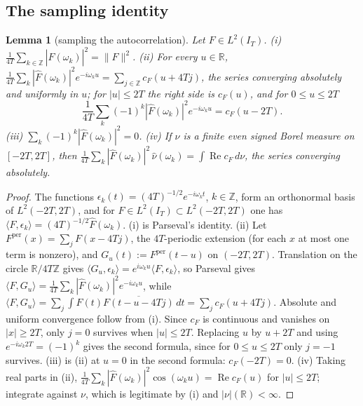 \documentclass[11pt]{amsart}
\newtheorem{lemma}[theorem]{Lemma}
\theoremstyle{definition}
\theoremstyle{remark}
\newcommand{\R}{\mathbb R}
\newcommand{\Z}{\mathbb Z}
\newcommand{\Rel}{\operatorname{Re}}
\newcommand{\IT}{I_T}
\newcommand{\nuh}{\widehat\nu}
\newcommand{\Fh}{\widehat F}
\newcommand{\cF}{c_F}
\begin{document}
\subsection{The sampling identity}

\begin{lemma}[sampling the autocorrelation]\label{lem:nyq-sampling}
Let $F\in L^2(\IT)$.
\emph{(i)} $\frac1{4T}\sum_{k\in\Z}|\Fh(\omega_k)|^2=\|F\|^2$.
\emph{(ii)} For every $u\in\R$, $\frac1{4T}\sum_k|\Fh(\omega_k)|^2e^{-i\omega_ku}=\sum_{j\in\Z}\cF(u+4Tj)$, the
series converging absolutely and uniformly in $u$; for $|u|\le2T$ the right side is $\cF(u)$, and for
$0\le u\le2T$
\[
\frac1{4T}\sum_k(-1)^k|\Fh(\omega_k)|^2e^{-i\omega_ku}=\cF(u-2T).
\]
\emph{(iii)} $\sum_k(-1)^k|\Fh(\omega_k)|^2=0$.
\emph{(iv)} If $\nu$ is a finite even signed Borel measure on $[-2T,2T]$, then
$\frac1{4T}\sum_k|\Fh(\omega_k)|^2\,\nuh(\omega_k)=\int\Rel\cF\,d\nu$, the series converging absolutely.
\end{lemma}

\begin{proof}
The functions $\epsilon_k(t)=(4T)^{-1/2}e^{-i\omega_kt}$, $k\in\Z$, form an orthonormal basis of
$L^2(-2T,2T)$, and for $F\in L^2(\IT)\subset L^2(-2T,2T)$ one has $\langle F,\epsilon_k\rangle=(4T)^{-1/2}\Fh(\omega_k)$.
(i) is Parseval's identity. (ii) Let $F^{\mathrm{per}}(x)=\sum_jF(x-4Tj)$, the $4T$-periodic extension (for each
$x$ at most one term is nonzero), and $G_u(t):=F^{\mathrm{per}}(t-u)$ on $(-2T,2T)$. Translation on the circle
$\R/4T\Z$ gives $\langle G_u,\epsilon_k\rangle=e^{i\omega_ku}\langle F,\epsilon_k\rangle$, so Parseval gives
$\langle F,G_u\rangle=\frac1{4T}\sum_k|\Fh(\omega_k)|^2e^{-i\omega_ku}$, while
$\langle F,G_u\rangle=\sum_j\int F(t)\overline{F(t-u-4Tj)}\,dt=\sum_j\cF(u+4Tj)$. Absolute and uniform convergence
follow from (i). Since $\cF$ is continuous and vanishes on $|x|\ge2T$, only $j=0$ survives when $|u|\le2T$.
Replacing $u$ by $u+2T$ and using $e^{-i\omega_k2T}=(-1)^k$ gives the second formula, since for
$0\le u\le2T$ only $j=-1$ survives. (iii) is (ii) at $u=0$ in the second formula: $\cF(-2T)=0$.
(iv) Taking real parts in (ii), $\frac1{4T}\sum_k|\Fh(\omega_k)|^2\cos(\omega_ku)=\Rel\cF(u)$ for $|u|\le2T$;
integrate against $\nu$, which is legitimate by (i) and $|\nu|(\R)<\infty$.
\end{proof}
\end{document}
